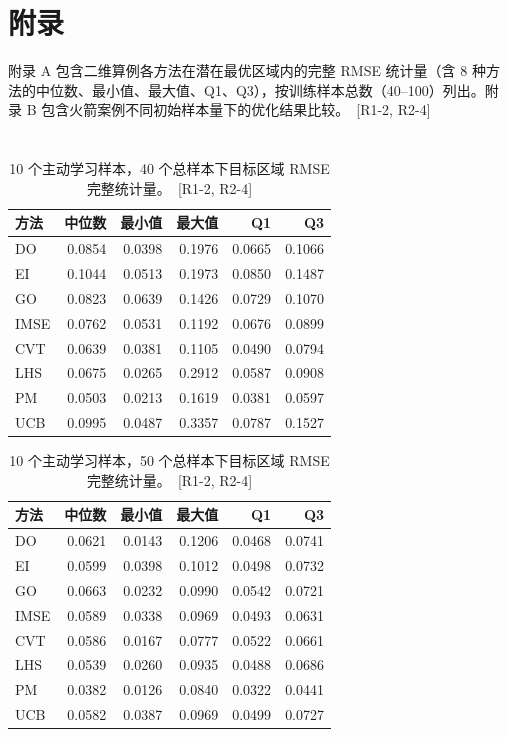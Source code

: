 \documentclass[]{interact}
\DeclareRobustCommand{\reviewadd}[2]{{\color{red}#1}\ {\color{blue}\footnotesize[#2]}}
\theoremstyle{plain}%
\theoremstyle{definition}
\theoremstyle{remark}
\begin{document}
\section{附录}

\appendix

\reviewadd{附录 A 包含二维算例各方法在潜在最优区域内的完整 RMSE 统计量（含 8 种方法的中位数、最小值、最大值、Q1、Q3），按训练样本总数（40--100）列出。附录 B 包含火箭案例不同初始样本量下的优化结果比较。}{R1-2, R2-4}

\section{ }

\begin{table}[h!]
	\centering
	\caption{\reviewadd{10 个主动学习样本，40 个总样本下目标区域 RMSE 完整统计量。}{R1-2, R2-4}}
	\label{tab:app_a1}
	\begin{tabular}{l rrrrr}
		\toprule
		方法 & 中位数 & 最小值 & 最大值 & Q1 & Q3 \\
		\midrule
		DO   & 0.0854 & 0.0398 & 0.1976 & 0.0665 & 0.1066 \\
		EI   & 0.1044 & 0.0513 & 0.1973 & 0.0850 & 0.1487 \\
		GO   & 0.0823 & 0.0639 & 0.1426 & 0.0729 & 0.1070 \\
		IMSE & 0.0762 & 0.0531 & 0.1192 & 0.0676 & 0.0899 \\
		CVT  & 0.0639 & 0.0381 & 0.1105 & 0.0490 & 0.0794 \\
		LHS  & 0.0675 & 0.0265 & 0.2912 & 0.0587 & 0.0908 \\
		PM   & 0.0503 & 0.0213 & 0.1619 & 0.0381 & 0.0597 \\
		UCB  & 0.0995 & 0.0487 & 0.3357 & 0.0787 & 0.1527 \\
		\bottomrule
	\end{tabular}
\end{table}

\begin{table}[h!]
	\centering
	\caption{\reviewadd{10 个主动学习样本，50 个总样本下目标区域 RMSE 完整统计量。}{R1-2, R2-4}}
	\label{tab:app_a2}
	\begin{tabular}{l rrrrr}
		\toprule
		方法 & 中位数 & 最小值 & 最大值 & Q1 & Q3 \\
		\midrule
		DO   & 0.0621 & 0.0143 & 0.1206 & 0.0468 & 0.0741 \\
		EI   & 0.0599 & 0.0398 & 0.1012 & 0.0498 & 0.0732 \\
		GO   & 0.0663 & 0.0232 & 0.0990 & 0.0542 & 0.0721 \\
		IMSE & 0.0589 & 0.0338 & 0.0969 & 0.0493 & 0.0631 \\
		CVT  & 0.0586 & 0.0167 & 0.0777 & 0.0522 & 0.0661 \\
		LHS  & 0.0539 & 0.0260 & 0.0935 & 0.0488 & 0.0686 \\
		PM   & 0.0382 & 0.0126 & 0.0840 & 0.0322 & 0.0441 \\
		UCB  & 0.0582 & 0.0387 & 0.0969 & 0.0499 & 0.0727 \\
		\bottomrule
	\end{tabular}
\end{table}
\end{document}
